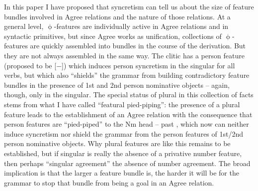 \documentclass[output=paper]{langscibook}
\begin{document}
In this paper I have proposed that  syncretism can tell us about the size of feature bundles involved in  Agree relations and the nature of those relations. At a general level, $\upphi$-features are individually active in Agree relations and in syntactic primitives, but since Agree works as unification, collections of $\upphi$-features are quickly assembled into bundles in the course of the derivation. But they are not always assembled in the same way. The \stin{} clitic has a person feature (proposed to be [$-$]) which induces person syncretism in the singular for all \stin{} verbs, but which also ``shields'' the grammar from building contradictory feature bundles in the presence of 1st and 2nd person nominative objects -- again, though, only in the singular. The special status of plural in this collection of facts stems from what I have called ``featural pied-piping'': the presence of a plural feature leads to the establishment of an Agree relation with the consequence that person features are ``pied-piped'' to the Nm head -- past \stin{}, which now can neither induce syncretism nor shield the grammar from the person features of 1st/2nd person nominative objects. Why plural features are like this remains to be established, but if singular is really the absence of a privative number feature, then perhaps ``singular agreement''  the absence of number agreement. The broad implication is that the larger a feature bundle is, the harder it will be for the grammar to stop that bundle from being a goal in an Agree relation.  


\end{document}
